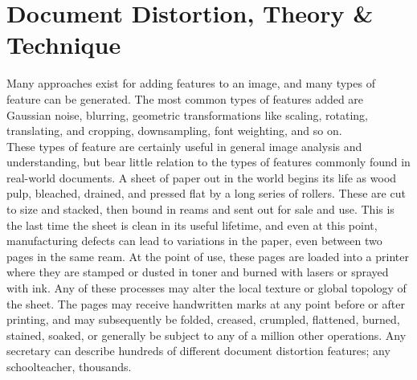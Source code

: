 \documentclass[runningheads]{llncs}
\begin{document}
%
%
%

\section{Document Distortion, Theory \& Technique}
Many approaches exist for adding features to an image, and many types of feature can be generated. The most common types of features added are Gaussian noise, blurring, geometric transformations like scaling, rotating, translating, and cropping, downsampling, font weighting, and so on.\\

These types of feature are certainly useful in general image analysis and understanding, but bear little relation to the types of features commonly found in real-world documents. A sheet of paper out in the world begins its life as wood pulp, bleached, drained, and pressed flat by a long series of rollers. These are cut to size and stacked, then bound in reams and sent out for sale and use. This is the last time the sheet is clean in its useful lifetime, and even at this point, manufacturing defects can lead to variations in the paper, even between two pages in the same ream. At the point of use, these pages are loaded into a printer where they are stamped or dusted in toner and burned with lasers or sprayed with ink. Any of these processes may alter the local texture or global topology of the sheet. The pages may receive handwritten marks at any point before or after printing, and may subsequently be folded, creased, crumpled, flattened, burned, stained, soaked, or generally be subject to any of a million other operations. Any secretary can describe hundreds of different document distortion features; any schoolteacher, thousands.\\
\end{document}
